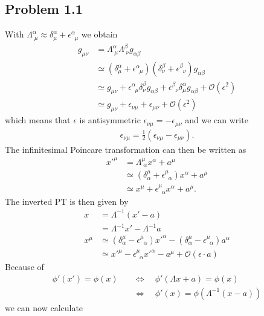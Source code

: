 \documentclass[10pt,a4paper]{book}
\theoremstyle{definition}
\begin{document}
\subsection{Problem 1.1}
With $\Lambda^\alpha_{\;\mu}\approx\delta^\alpha_\mu+\epsilon^\alpha_{\;\;\mu}$ we obtain
\begin{align}
g_{\mu\nu}
&=\Lambda^\alpha_{\;\mu}\Lambda^\beta_{\;\nu}g_{\alpha\beta}\\
&\simeq\left(\delta^\alpha_\mu+\epsilon^\alpha_{\;\;\mu}\right)\left(\delta^\beta_\nu+\epsilon^\beta_{\;\;\nu}\right)g_{\alpha\beta}\\
&\simeq g_{\mu\nu}+\epsilon^\alpha_{\;\;\mu}\delta^\beta_\nu g_{\alpha\beta}+\epsilon^\beta_{\;\;\nu}\delta^\alpha_\mu g_{\alpha\beta}+\mathcal{O}(\epsilon^2)\\
&\simeq g_{\mu\nu}+\epsilon_{\nu\mu}+\epsilon_{\mu\nu}+\mathcal{O}(\epsilon^2)
\end{align}
which means that $\epsilon$ is antisymmetric $\epsilon_{\nu\mu}=-\epsilon_{\mu\nu}$ and we can write
\begin{align}
\epsilon_{\nu\mu}=\frac{1}{2}\left(\epsilon_{\nu\mu}-\epsilon_{\mu\nu}\right).
\end{align}
The infinitesimal Poincare transformation can then be written as
\begin{align}
x'^\mu
&=\Lambda^\mu_{\;\alpha}x^\alpha+a^\mu\\
&\simeq\left(\delta^\mu_\alpha+\epsilon^\mu_{\;\;\alpha}\right)x^\alpha+a^\mu\\
&\simeq x^\mu+\epsilon^\mu_{\;\;\alpha}x^\alpha+a^\mu.
\end{align}
The inverted PT is then given by
\begin{align}
x&=\Lambda^{-1}(x'-a)\\
&=\Lambda^{-1}x'-\Lambda^{-1}a\\
x^\mu&\simeq\left(\delta^\mu_\alpha-\epsilon^\mu_{\;\;\alpha}\right)x'^\alpha-\left(\delta^\mu_\alpha-\epsilon^\mu_{\;\;\alpha}\right)a^\alpha\\
&\simeq x'^\mu-\epsilon^\mu_{\;\;\alpha}x'^\alpha-a^\mu+\mathcal{O}(\epsilon\cdot a)
\end{align}
Because of 
\begin{align}
\phi'(x')=\phi(x)
&\quad\Leftrightarrow\quad\phi'(\Lambda x+a)=\phi(x)\\
&\quad\Leftrightarrow\quad\phi'(x)=\phi(\Lambda^{-1}(x-a))
\end{align}
we can now calculate 
\end{document}
